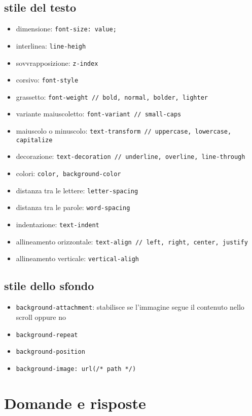 \documentclass[12pt]{article}
\begin{document}
\subsection{stile del testo}
\begin{itemize}
	\item dimensione: \lstinline{font-size: value;}
	\item interlinea: \lstinline{line-heigh}
	\item sovvrapposizione: \lstinline{z-index}
	\item corsivo: \lstinline{font-style}
	\item grassetto: \lstinline{font-weight // bold, normal, bolder, lighter}
	\item variante maiuscoletto: \lstinline{font-variant // small-caps}
	\item maiuscolo o minuscolo: \lstinline{text-transform // uppercase, lowercase, capitalize}
	\item decorazione: \lstinline{text-decoration // underline, overline, line-through}
	\item colori: \lstinline{color, background-color}

	\item distanza tra le lettere: \lstinline{letter-spacing}
	\item distanza tra le parole: \lstinline{word-spacing}
	\item indentazione: \lstinline{text-indent}
	\item allineamento orizzontale: \lstinline{text-align // left, right, center, justify}
	\item allineamento verticale: \lstinline{vertical-aligh}
\end{itemize}

\subsection{stile dello sfondo}
\begin{itemize}
	\item \lstinline{background-attachment}: stabilisce se l'immagine segue il
	      contenuto nello scroll oppure no
	\item \lstinline{background-repeat}
	\item \lstinline{background-position}
	\item \lstinline{background-image: url(/* path */)}
\end{itemize}

\section{Domande e risposte}
\end{document}
